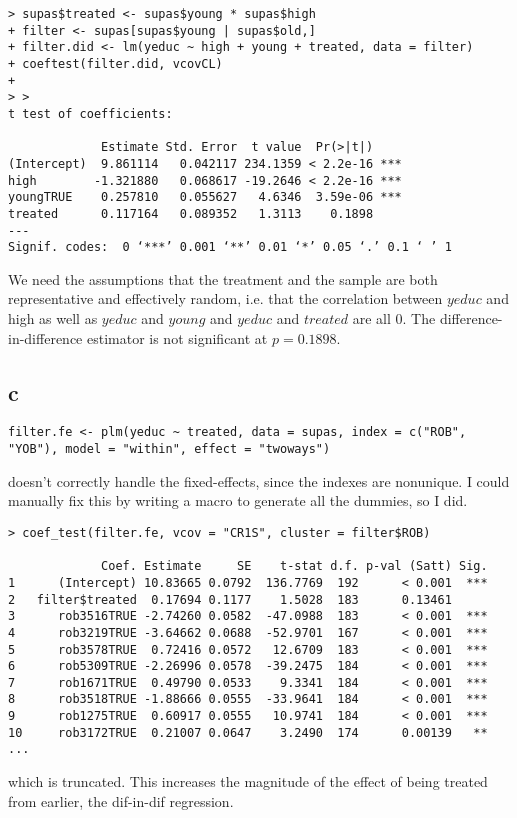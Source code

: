 \documentclass[12pt,letterpaper]{article}
\theoremstyle{definition}
\begin{document}
\begin{Verbatim}[fontsize=\small]
> supas$treated <- supas$young * supas$high
+ filter <- supas[supas$young | supas$old,]
+ filter.did <- lm(yeduc ~ high + young + treated, data = filter)
+ coeftest(filter.did, vcovCL)
+
> >
t test of coefficients:

             Estimate Std. Error  t value  Pr(>|t|)
(Intercept)  9.861114   0.042117 234.1359 < 2.2e-16 ***
high        -1.321880   0.068617 -19.2646 < 2.2e-16 ***
youngTRUE    0.257810   0.055627   4.6346  3.59e-06 ***
treated      0.117164   0.089352   1.3113    0.1898
---
Signif. codes:  0 ‘***’ 0.001 ‘**’ 0.01 ‘*’ 0.05 ‘.’ 0.1 ‘ ’ 1
\end{Verbatim}
We need the assumptions that the treatment and the sample are both representative and effectively random, i.e. that the correlation between $yeduc$ and high as well as $yeduc$ and $young$ and $yeduc$ and $treated$ are all 0. The difference-in-difference estimator is not significant at $p = 0.1898$.

\subsection*{c}

\begin{Verbatim}[fontsize=\small]
filter.fe <- plm(yeduc ~ treated, data = supas, index = c("ROB", "YOB"), model = "within", effect = "twoways")
\end{Verbatim}
doesn't correctly handle the fixed-effects, since the indexes are nonunique. I could manually fix this by writing a macro to generate all the dummies, so I did.
\begin{Verbatim}[fontsize=\small]
> coef_test(filter.fe, vcov = "CR1S", cluster = filter$ROB)

             Coef. Estimate     SE    t-stat d.f. p-val (Satt) Sig.
1      (Intercept) 10.83665 0.0792  136.7769  192      < 0.001  ***
2   filter$treated  0.17694 0.1177    1.5028  183      0.13461
3      rob3516TRUE -2.74260 0.0582  -47.0988  183      < 0.001  ***
4      rob3219TRUE -3.64662 0.0688  -52.9701  167      < 0.001  ***
5      rob3578TRUE  0.72416 0.0572   12.6709  183      < 0.001  ***
6      rob5309TRUE -2.26996 0.0578  -39.2475  184      < 0.001  ***
7      rob1671TRUE  0.49790 0.0533    9.3341  184      < 0.001  ***
8      rob3518TRUE -1.88666 0.0555  -33.9641  184      < 0.001  ***
9      rob1275TRUE  0.60917 0.0555   10.9741  184      < 0.001  ***
10     rob3172TRUE  0.21007 0.0647    3.2490  174      0.00139   **
...
\end{Verbatim}
which is truncated. This increases the magnitude of the effect of being treated from earlier, the dif-in-dif regression.
\end{document}
